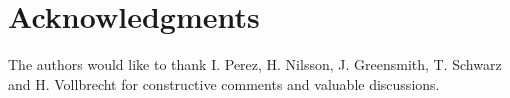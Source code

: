 \section*{Acknowledgments}
The authors would like to thank I. Perez, H. Nilsson, J. Greensmith, T. Schwarz and H. Vollbrecht for constructive comments and valuable discussions.